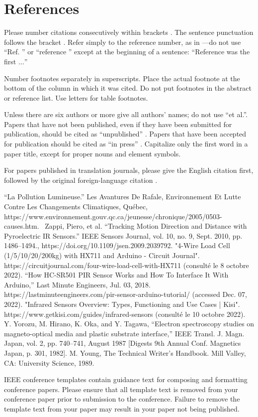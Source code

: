 \documentclass[journal]{IEEEtran}
\begin{document}
\section*{References}

Please number citations consecutively within brackets \cite{b1}. The 
sentence punctuation follows the bracket \cite{b2}. Refer simply to the reference 
number, as in \cite{b3}---do not use ``Ref. \cite{b3}'' or ``reference \cite{b3}'' except at 
the beginning of a sentence: ``Reference \cite{b3} was the first $\ldots$''

Number footnotes separately in superscripts. Place the actual footnote at 
the bottom of the column in which it was cited. Do not put footnotes in the 
abstract or reference list. Use letters for table footnotes.

Unless there are six authors or more give all authors' names; do not use 
``et al.''. Papers that have not been published, even if they have been 
submitted for publication, should be cited as ``unpublished'' \cite{b4}. Papers 
that have been accepted for publication should be cited as ``in press'' \cite{b5}. 
Capitalize only the first word in a paper title, except for proper nouns and 
element symbols.

For papers published in translation journals, please give the English 
citation first, followed by the original foreign-language citation \cite{b6}.



\begin{thebibliography}{00}
 “La Pollution Lumineuse.” Les Avantures De Rafale, Environnement Et Lutte Contre Les Changements Climatiques, Québec, https://www.environnement.gouv.qc.ca/jeunesse/chronique/2005/0503-causes.htm. 
 Zappi, Piero, et al. “Tracking Motion Direction and Distance with Pyroelectric IR Sensors.” IEEE Sensors Journal, vol. 10, no. 9, Sept. 2010, pp. 1486–1494., https://doi.org/10.1109/jsen.2009.2039792.
 "4-Wire Load Cell (1/5/10/20/200kg) with HX711 and Arduino - Circuit Journal". https://circuitjournal.com/four-wire-load-cell-with-HX711 (consulté le 8 octobre 2022).
 “How HC-SR501 PIR Sensor Works and How To Interface It With Arduino,” Last Minute Engineers, Jul. 03, 2018. https://lastminuteengineers.com/pir-sensor-arduino-tutorial/ (accessed Dec. 07, 2022).
 "Infrared Sensors Overview: Types, Functioning and Use Cases | Kisi". https://www.getkisi.com/guides/infrared-sensors (consulté le 10 octobre 2022).
 Y. Yorozu, M. Hirano, K. Oka, and Y. Tagawa, ``Electron spectroscopy studies on magneto-optical media and plastic substrate interface,'' IEEE Transl. J. Magn. Japan, vol. 2, pp. 740--741, August 1987 [Digests 9th Annual Conf. Magnetics Japan, p. 301, 1982].
 M. Young, The Technical Writer's Handbook. Mill Valley, CA: University Science, 1989.
\end{thebibliography}
\vspace{12pt}
\color{red}
IEEE conference templates contain guidance text for composing and formatting conference papers. Please ensure that all template text is removed from your conference paper prior to submission to the conference. Failure to remove the template text from your paper may result in your paper not being published.
\end{document}
